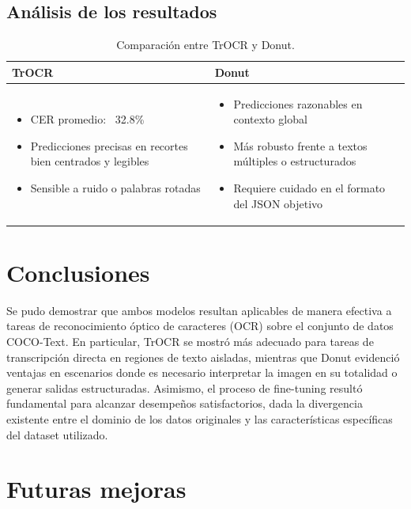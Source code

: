 \documentclass[12pt]{article}
\begin{document}
\subsection{Análisis de los resultados}

\begin{table}[h!]
\centering
\begin{tabular}{|p{6cm}|p{6cm}|}
\hline
\textbf{TrOCR} & \textbf{Donut} \\
\hline
\begin{itemize}
    \item CER promedio: ~32.8\%
    \item Predicciones precisas en recortes bien centrados y legibles
    \item Sensible a ruido o palabras rotadas
\end{itemize}
&
\begin{itemize}
    \item Predicciones razonables en contexto global
    \item Más robusto frente a textos múltiples o estructurados
    \item Requiere cuidado en el formato del JSON objetivo
\end{itemize}
\\
\hline
\end{tabular}
\caption{Comparación entre TrOCR y Donut.}
\label{tab:ventajas}
\end{table}


\section{Conclusiones}

Se pudo demostrar que ambos modelos resultan aplicables de manera efectiva a tareas de 
reconocimiento óptico de caracteres (OCR) sobre el conjunto de datos COCO-Text. En particular,
TrOCR se mostró más adecuado para tareas de transcripción directa en regiones de texto 
aisladas, mientras que Donut evidenció ventajas en escenarios donde es necesario interpretar 
la imagen en su totalidad o generar salidas estructuradas.
Asimismo, el proceso de fine-tuning resultó fundamental para alcanzar desempeños 
satisfactorios, dada la divergencia existente entre el dominio de los datos originales y
las características específicas del dataset utilizado.

\section{Futuras mejoras}
\end{document}
